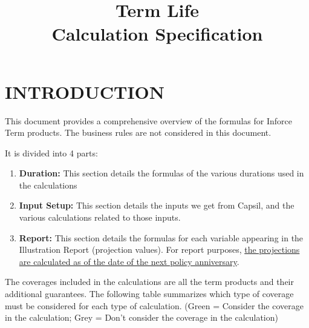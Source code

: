 \documentclass[10pt]{article}
\title{Term Life \\ Calculation Specification}
\author{}
\date{}
\begin{document}
\maketitle
\tableofcontents
\clearpage

\section*{INTRODUCTION}

This document provides a comprehensive overview of the formulas for Inforce Term products. The business rules are not considered in this document.

It is divided into 4 parts:

\begin{enumerate}
\item[1)] \textbf{Duration:} This section details the formulas of the various durations used in the calculations
\item[2)] \textbf{Input Setup:} This section details the inputs we get from Capsil, and the various calculations related to those inputs.
\item[3)] \textbf{Report:} This section details the formulas for each variable appearing in the Illustration Report (projection values). For report purposes, \underline{the projections are calculated as of the date of the next policy anniversary}.
\end{enumerate}

The coverages included in the calculations are all the term products and their additional guarantees. The following table summarizes which type of coverage must be considered for each type of calculation. (Green = Consider the coverage in the calculation; Grey = Don't consider the coverage in the calculation)
\end{document}
